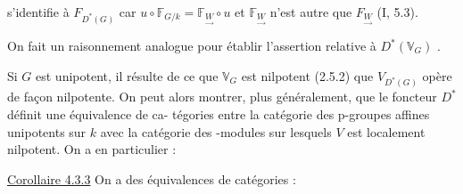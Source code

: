 
s'identifie à $F_{D^*(G)}$ car $u \circ \mathbb{F}_{G/k} = \mathbb{F}_{\underset{\rightarrow}{W}} \circ u$ et $\mathbb{F}_{\underset{\rightarrow}{W}}$ n'est autre que
$F_{\underset{\rightarrow}{W}}$ (I, 5.3).

On fait un raisonnement analogue pour établir l'assertion
relative à $D^*(\mathbb{V}_G)$ .

Si $G$ est unipotent, il résulte de ce que $\mathbb{V}_G$ est nilpotent
(2.5.2) que $V_{D^*(G)}$ opère de façon nilpotente. On peut alors montrer,
plus généralement, que le foncteur $D^*$ définit une équivalence de ca-%
tégories entre la catégorie des p-groupes affines unipotents sur $k$ avec
la catégorie des -modules sur lesquels $V$ est localement nilpotent. On
a en particulier :

\uline{Corollaire 4.3.3} On a des équivalences de catégories :



